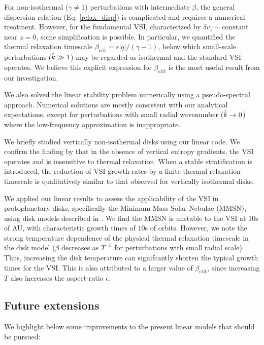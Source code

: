 For non-isothermal ($\gamma\neq1$) perturbations with intermediate
$\beta$, the general dispersion relation
(Eq. \ref{relax_disp}) is complicated and requires a numerical
treatment. However, for the fundamental VSI, characterized by  $\delta
v_z\sim\mathrm{constant}$ near $z=0$, some simplification is
possible. In particular, we quantified the thermal relaxation
timescale $\beta_\mathrm{crit}=\epsilon|q|/(\gamma-1)$, below
which small-scale perturbations ($\hat{k}\gg 1$) may be regarded as isothermal
and the standard VSI operates. We believe this explicit expression for
$\beta_\mathrm{crit}$ is the most useful result from our
investigation. 

We also solved the linear stability problem numerically using a
pseudo-spectral approach. Numerical solutions are mostly consistent
with our analytical expectations, except for perturbations with small
radial wavenumber ($\hat{k}\to0$) where the low-frequency approximation
is inappropriate.  

We briefly studied vertically non-isothermal disks using our linear
code. We confirm the finding by \cite{nelson13} that in the absence
of vertical entropy gradients, the VSI operates and is insensitive to thermal relaxation. When a
stable stratification is introduced, the reduction of VSI growth
rates by a finite thermal relaxation timescale is qualitatively similar to
that observed for vertically isothermal disks. 


We applied our linear results to assess the applicability of the VSI in
protoplanetary disks, specifically the Minimum Mass Solar Nebulae (MMSN),
using disk models described in \cite{chiang10}. We find the MMSN is
unstable to the VSI at $10$s of AU, with characteristic
growth times of $10$s of orbits. However, we note the strong
temperature dependence of the physical thermal relaxation timescale
in the disk model ($\beta$ decreases as $T^{-5}$ for perturbations with small
radial scale). Thus, increasing the disk temperature can signifcantly 
shorten the typical growth times for the VSI. This is also attributed
to a larger value of $\beta_\mathrm{crit}$, since increasing $T$ also
increases the aspect-ratio $\epsilon$. 




\subsection{Future extensions} 
We highlight below some improvements to the present  
linear models that should be pursued:

